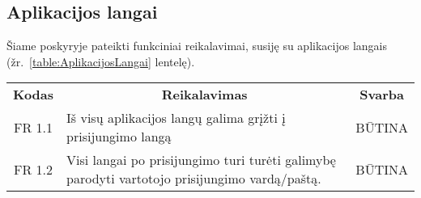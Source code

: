 \documentclass{VUMIFPSkursinis}
\begin{document}
\subsection{Aplikacijos langai}

 Šiame poskyryje pateikti funkciniai reikalavimai, susiję su aplikacijos langais (žr.~\ref{table:AplikacijosLangai} lentelę).
\begin{center}
	\begin{table}[H]
	\begin{tabular}{|p{2cm}|p{}|p{}|}
	\hline
	    \rowcolor{lightgray}
		\multicolumn{3}{|c|}{Aplikacijos langai}\\
		
	\hline
		\multicolumn{1}{|c|}{{\bfseries Kodas}}&
		\multicolumn{1}{|c|}{{\bfseries Reikalavimas}}&
		\multicolumn{1}{|c|}{{\bfseries Svarba}}\\

	\hline
		\multicolumn{1}{|c|}{FR 1.1} &
		Iš visų aplikacijos langų galima grįžti į prisijungimo langą &
		\multicolumn{1}{|c|}{BŪTINA}\\
	\hline
		\multicolumn{1}{|c|}{FR 1.2} &
		{Visi langai po prisijungimo turi turėti galimybę parodyti vartotojo \newline prisijungimo vardą/paštą.}&
		\multicolumn{1}{|c|}{BŪTINA}\\
	\hline
	

\end{tabular}
\end{table}
\end{center}
\end{document}
